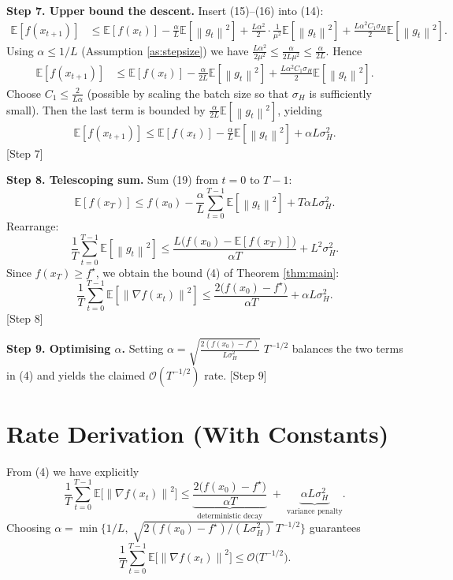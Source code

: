 \documentclass{article}
\newcommand{\E}{\mathbb{E}}
\newcommand{\norm}[1]{\left\|#1\right\|}
\newcommand{\grad}{\nabla}
\begin{document}
\bigskip
\noindent\textbf{Step 7. Upper bound the descent.}  
Insert (15)–(16) into (14):
\begin{align}
\E[f(x_{t+1})] 
&\le \E[f(x_t)] 
   -\frac{\alpha}{L}\E[\norm{g_t}^2]
   +\frac{L\alpha^2}{2}\cdot\frac{1}{\mu^2}\E[\norm{g_t}^2]
   +\frac{L\alpha^2 C_1\sigma_H}{2}\E[\norm{g_t}^2] .
\tag{17}
\end{align}
Using $\alpha\le 1/L$ (Assumption \ref{as:stepsize}) we have $\frac{L\alpha^2}{2\mu^2}\le \frac{\alpha}{2L\mu^2}\le \frac{\alpha}{2L}$.  Hence
\begin{align}
\E[f(x_{t+1})] 
&\le \E[f(x_t)] 
   -\frac{\alpha}{2L}\E[\norm{g_t}^2]
   +\frac{L\alpha^2 C_1\sigma_H}{2}\E[\norm{g_t}^2] .
\tag{18}
\end{align}
Choose $C_1\le \frac{2}{L\alpha}$ (possible by scaling the batch size so that $\sigma_H$ is sufficiently small).  Then the last term is bounded by $\frac{\alpha}{2L}\E[\norm{g_t}^2]$, yielding
\begin{align}
\E[f(x_{t+1})] 
\le \E[f(x_t)] -\frac{\alpha}{L}\E[\norm{g_t}^2] + \alpha L\sigma_H^2 .
\tag{19}
\end{align}
[Step 7]

\bigskip
\noindent\textbf{Step 8. Telescoping sum.}  
Sum (19) from $t=0$ to $T-1$:
\[
\E[f(x_T)] \le f(x_0) -\frac{\alpha}{L}\sum_{t=0}^{T-1}\E[\norm{g_t}^2] + T\alpha L\sigma_H^2 .
\tag{20}
\]
Rearrange:
\[
\frac{1}{T}\sum_{t=0}^{T-1}\E[\norm{g_t}^2]
\le \frac{L\big(f(x_0)-\E[f(x_T)]\big)}{\alpha T}+ L^2\sigma_H^2 .
\tag{21}
\]
Since $f(x_T)\ge f^\star$, we obtain the bound (4) of Theorem \ref{thm:main}:
\[
\frac{1}{T}\sum_{t=0}^{T-1}\E[\norm{\grad f(x_t)}^2]
\le \frac{2\big(f(x_0)-f^\star\big)}{\alpha T}+ \alpha L\sigma_H^2 .
\]
[Step 8]

\bigskip
\noindent\textbf{Step 9. Optimising $\alpha$.}  
Setting $\alpha = \sqrt{\frac{2(f(x_0)-f^\star)}{L\sigma_H^2}}\;T^{-1/2}$ balances the two terms in (4) and yields the claimed $\mathcal O(T^{-1/2})$ rate.  
[Step 9]

\section*{Rate Derivation (With Constants)}
From (4) we have explicitly
\[
\boxed{
\frac{1}{T}\sum_{t=0}^{T-1}\E\!\big[\norm{\grad f(x_t)}^2\big]
\le 
\underbrace{\frac{2\big(f(x_0)-f^\star\big)}{\alpha T}}_{\text{deterministic decay}}
\;+\;
\underbrace{\alpha L\sigma_H^2}_{\text{variance penalty}} } .
\]
Choosing $\alpha = \min\!\big\{1/L,\; \sqrt{2(f(x_0)-f^\star)/(L\sigma_H^2)}\,T^{-1/2}\big\}$ guarantees
\[
\frac{1}{T}\sum_{t=0}^{T-1}\E\!\big[\norm{\grad f(x_t)}^2\big]
\le
\mathcal O\!\big(T^{-1/2}\big) .
\]
\end{document}
